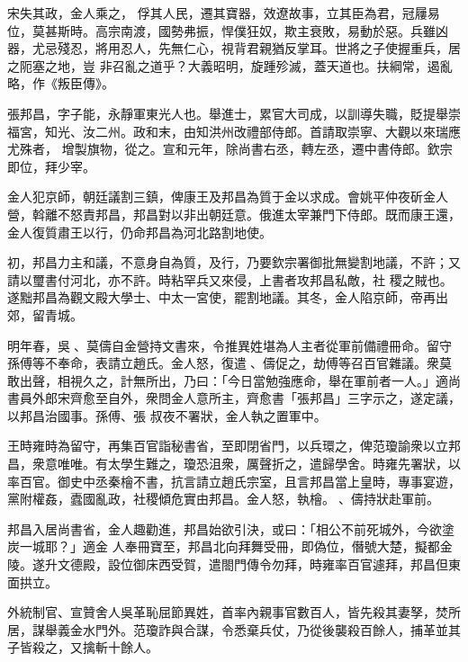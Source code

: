
\begin{pinyinscope}

 宋失其政，金人乘之，
 俘其人民，遷其寶器，效遼故事，立其臣為君，冠屨易位，莫甚斯時。高宗南渡，國勢弗振，悍僕狂奴，欺主衰敗，易動於惡。兵雖凶器，尤忌殘忍，將用忍人，先無仁心，視背君親猶反掌耳。世將之子使握重兵，居之阨塞之地，豈
 非召亂之道乎？大義昭明，旋踵殄滅，蓋天道也。扶綱常，遏亂略，作《叛臣傳》。



 張邦昌，字子能，永靜軍東光人也。舉進士，累官大司成，以訓導失職，貶提舉崇福宮，知光、汝二州。政和末，由知洪州改禮部侍郎。首請取崇寧、大觀以來瑞應尤殊者，
 增製旗物，從之。宣和元年，除尚書右丞，轉左丞，遷中書侍郎。欽宗即位，拜少宰。



 金人犯京師，朝廷議割三鎮，俾康王及邦昌為質于金以求成。會姚平仲夜斫金人營，斡離不怒責邦昌，邦昌對以非出朝廷意。俄進太宰兼門下侍郎。既而康王還，金人復質肅王以行，仍命邦昌為河北路割地使。



 初，邦昌力主和議，不意身自為質，及行，乃要欽宗署御批無變割地議，不許；又請以璽書付河北，亦不許。時粘罕兵又來侵，上書者攻邦昌私敵，社
 稷之賊也。遂黜邦昌為觀文殿大學士、中太一宮使，罷割地議。其冬，金人陷京師，帝再出郊，留青城。



 明年春，吳𠦅、莫儔自金營持文書來，令推異姓堪為人主者從軍前備禮冊命。留守孫傅等不奉命，表請立趙氏。金人怒，復遣𠦅、儔促之，劫傅等召百官雜議。衆莫敢出聲，相視久之，計無所出，乃曰：「今日當勉強應命，舉在軍前者一人。」適尚書員外郎宋齊愈至自外，衆問金人意所主，齊愈書「張邦昌」三字示之，遂定議，以邦昌治國事。孫傅、張
 叔夜不署狀，金人執之置軍中。



 王時雍時為留守，再集百官詣秘書省，至即閉省門，以兵環之，俾范瓊諭衆以立邦昌，衆意唯唯。有太學生難之，瓊恐沮衆，厲聲折之，遣歸學舍。時雍先署狀，以率百官。御史中丞秦檜不書，抗言請立趙氏宗室，且言邦昌當上皇時，專事宴遊，黨附權姦，蠹國亂政，社稷傾危實由邦昌。金人怒，執檜。𠦅、儔持狀赴軍前。



 邦昌入居尚書省，金人趣勸進，邦昌始欲引決，或曰：「相公不前死城外，今欲塗炭一城耶？」適金
 人奉冊寶至，邦昌北向拜舞受冊，即偽位，僭號大楚，擬都金陵。遂升文德殿，設位御床西受賀，遣閤門傳令勿拜，時雍率百官遽拜，邦昌但東面拱立。



 外統制官、宣贊舍人吳革恥屈節異姓，首率內親事官數百人，皆先殺其妻孥，焚所居，謀舉義金水門外。范瓊詐與合謀，令悉棄兵仗，乃從後襲殺百餘人，捕革並其子皆殺之，又擒斬十餘人。




\end{pinyinscope}

